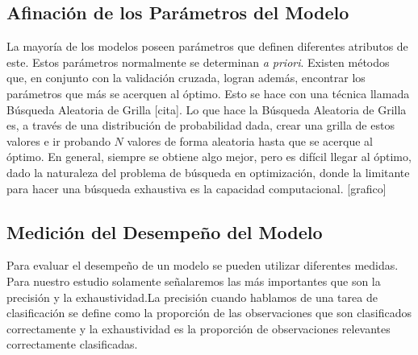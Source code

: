 
\subsection{Afinación de los Parámetros del Modelo}
La mayoría de los modelos poseen parámetros que definen diferentes atributos de este. Estos parámetros normalmente se determinan \textit{a priori}. Existen métodos que, en conjunto con la validación cruzada, logran además, encontrar los parámetros que más se acerquen al óptimo. Esto se hace con una técnica llamada Búsqueda Aleatoria de Grilla [cita]. Lo que hace la Búsqueda Aleatoria de Grilla es, a través de una distribución de probabilidad dada, crear una grilla de estos valores e ir probando $N$ valores de forma aleatoria hasta que se acerque al óptimo. En general, siempre se obtiene algo mejor, pero es difícil llegar al óptimo, dado la naturaleza del problema de búsqueda en optimización, donde la limitante para hacer una búsqueda exhaustiva es la capacidad computacional.
[grafico]
\subsection{Medición del Desempeño del Modelo}

Para evaluar el desempeño de un modelo se pueden utilizar diferentes medidas. Para nuestro estudio solamente señalaremos las más importantes que son la precisión y la exhaustividad.La precisión cuando hablamos de una tarea de clasificación se define como la proporción de las observaciones que son clasificados correctamente y la exhaustividad es la proporción de observaciones relevantes correctamente clasificadas.

